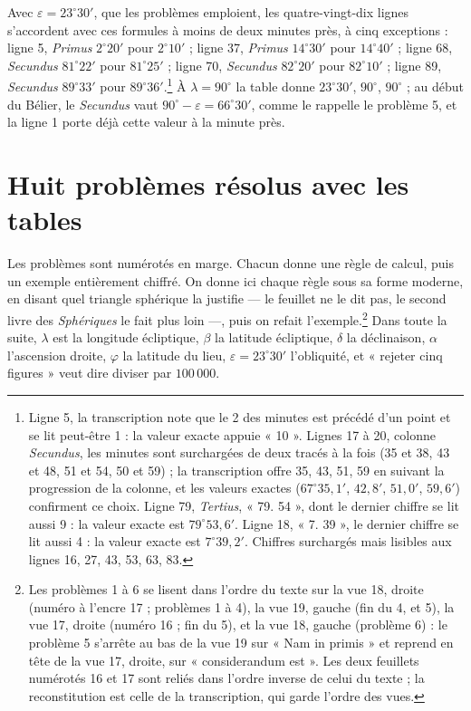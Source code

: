 \documentclass[11pt,a4paper]{article}
\begin{document}
Avec $\varepsilon = 23^\circ 30'$, que les problèmes emploient, les quatre-vingt-dix
lignes s'accordent avec ces formules à moins de deux minutes près, à cinq
exceptions : ligne 5, \emph{Primus} $2^\circ 20'$ pour $2^\circ 10'$ ; ligne 37,
\emph{Primus} $14^\circ 30'$ pour $14^\circ 40'$ ; ligne 68, \emph{Secundus}
$81^\circ 22'$ pour $81^\circ 25'$ ; ligne 70, \emph{Secundus} $82^\circ 20'$ pour
$82^\circ 10'$ ; ligne 89, \emph{Secundus} $89^\circ 33'$ pour
$89^\circ 36'$.\footnote{Ligne 5, la transcription note que le 2 des minutes est
précédé d'un point et se lit peut-être 1 : la valeur exacte appuie « 10 ». Lignes
17 à 20, colonne \emph{Secundus}, les minutes sont surchargées de deux tracés à
la fois (35 et 38, 43 et 48, 51 et 54, 50 et 59) ; la transcription offre 35, 43,
51, 59 en suivant la progression de la colonne, et les valeurs exactes
($67^\circ 35{,}1'$, $42{,}8'$, $51{,}0'$, $59{,}6'$) confirment ce choix. Ligne 79,
\emph{Tertius}, « 79. 54 », dont le dernier chiffre se lit aussi 9 : la valeur
exacte est $79^\circ 53{,}6'$. Ligne 18, « 7. 39 », le dernier chiffre se lit aussi
4 : la valeur exacte est $7^\circ 39{,}2'$. Chiffres surchargés mais lisibles aux
lignes 16, 27, 43, 53, 63, 83.} À $\lambda = 90^\circ$ la table donne
$23^\circ 30'$, $90^\circ$, $90^\circ$ ; au début du Bélier, le \emph{Secundus}
vaut $90^\circ - \varepsilon = 66^\circ 30'$, comme le rappelle le problème 5, et la
ligne 1 porte déjà cette valeur à la minute près.

\section*{Huit problèmes résolus avec les tables}

Les problèmes sont numérotés en marge. Chacun donne une règle de calcul, puis un
exemple entièrement chiffré. On donne ici chaque règle sous sa forme moderne, en
disant quel triangle sphérique la justifie — le feuillet ne le dit pas, le second
livre des \emph{Sphériques} le fait plus loin —, puis on refait
l'exemple.\footnote{Les problèmes 1 à 6 se lisent dans l'ordre du texte sur la
vue 18, droite (numéro à l'encre 17 ; problèmes 1 à 4), la vue 19, gauche (fin
du 4, et 5), la vue 17, droite (numéro 16 ; fin du 5), et la vue 18, gauche
(problème 6) : le problème 5 s'arrête au bas de la vue 19 sur « Nam in primis »
et reprend en tête de la vue 17, droite, sur « considerandum est ». Les deux
feuillets numérotés 16 et 17 sont reliés dans l'ordre inverse de celui du texte ;
la reconstitution est celle de la transcription, qui garde l'ordre des vues.}
Dans toute la suite, $\lambda$ est la longitude écliptique, $\beta$ la latitude
écliptique, $\delta$ la déclinaison, $\alpha$ l'ascension droite, $\varphi$ la
latitude du lieu, $\varepsilon = 23^\circ 30'$ l'obliquité, et « rejeter cinq
figures » veut dire diviser par $100\,000$.
\end{document}
